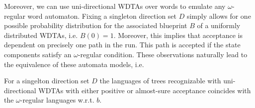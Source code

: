 Moreover, we can use uni-directional \acp{WDTA} over words to emulate any
$\omega$-regular word automaton. Fixing a singleton direction set $D$ simply
allows for one possible probability distribution for the associated blueprint
$B$ of a uniformly distributed \acp{WDTA}, i.e. $B(0) = 1$. Moreover, this
implies that acceptance is dependent on precisely one path in the run. This
path is accepted if the state components satisfy an $\omega$-regular condition.
These observations naturally lead to the equivalence of these automata models,
i.e.
\begin{theorem}
  For a singelton direction set $D$ the languages of
  trees recognizable with uni-directional \acp{WDTA} with either positive
  or almost-sure acceptance coincides with the $\omega$-regular languages
  w.r.t. $b$.
  \label{thm:omegaregaswdta}
\end{theorem}
